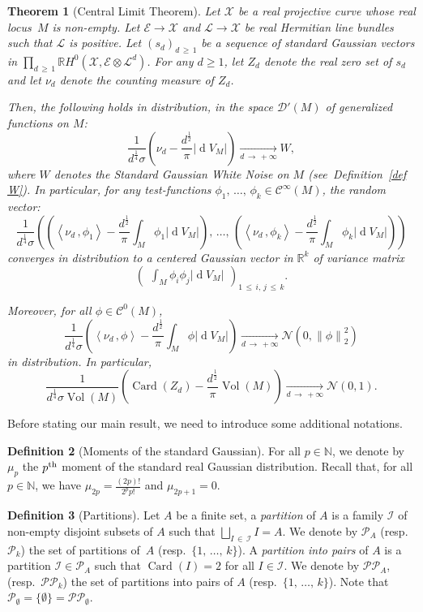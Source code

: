 \documentclass[10pt]{amsart}
\newtheorem{theo}{Theorem}[section]
\theoremstyle{definition}\newtheorem{defi}[theo]{Definition}\newtheorem{rema}[theo]{Remark}\newtheorem{exam}[theo]{Example}\newtheorem{exem}[theo]{Example}\newtheorem{nota}[theo]{Notation}
\DeclareMathOperator{\card}{Card}
\DeclareMathOperator{\dmesure}{d}
\DeclareMathOperator{\Vol}{Vol}
\newcommand{\D}{\mathcal{D}}
\newcommand{\E}{\mathcal{E}}
\newcommand{\I}{\mathcal{I}}
\newcommand{\X}{\mathcal{X}}
\renewcommand{\L}{\mathcal{L}}
\newcommand{\clN}{\mathcal{N}}
\newcommand{\clC}{\mathcal{C}}
\newcommand{\pa}{\mathcal{P}\!}
\newcommand{\pp}{\mathcal{P\!P}\!}
\newcommand{\N}{\mathbb{N}}
\newcommand{\R}{\mathbb{R}}
\newcommand{\norm}[1]{\left\lvert #1 \right\rvert}
\newcommand{\Norm}[1]{\left\lVert #1 \right\rVert}
\newcommand{\prsc}[2]{\left\langle #1\,, #2 \right\rangle}
\newcommand{\rmes}[1]{\norm{\dmesure\! V_{#1}}}
\newcommand{\vol}[1]{\Vol\!\left(#1\right)}
\renewcommand{\H}{H^0(\X,\E \otimes \L^d)}
\renewcommand{\geq}{\geqslant}
\renewcommand{\leq}{\leqslant}
\begin{document}
\begin{theo}[{Central Limit Theorem}]\label{thm central limit theorem}
Let $\X$ be a real projective curve whose real locus~$M$ is non-empty. Let $\E \to \X$ and $\L \to \X$ be real Hermitian line bundles such that $\L$ is positive. Let $(s_d)_{d\,\geq\,1}$ be a sequence of standard Gaussian vectors in $\prod_{d \,\geq\,1}\R \H$. For any $d \geq 1$, let $Z_d$ denote the real zero set of $s_d$ and let $\nu_d$ denote the counting measure of $Z_d$.

Then, the following holds in distribution, in the space $\D'(M)$ of generalized functions on $M$:
\[
\frac{1}{d^\frac{1}{4}\sigma}\left(\nu_d - \frac{d^\frac{1}{2}}{\pi}\rmes{M}\right) \xrightarrow[d\,\to\,+\infty]{} W,
\]
where $W$ denotes the Standard Gaussian White Noise on $M$ (see~Definition~\ref{def W}). In particular, for any test-functions $\phi_1,\,\dots,\,\phi_k \in \clC^\infty(M)$, the random vector:
\[
\frac{1}{d^\frac{1}{4}\sigma}\left(\left(\prsc{\nu_d}{\phi_1} - \frac{d^\frac{1}{2}}{\pi}\int_M \phi_1\rmes{M}\right),\,\dots,\, \left(\prsc{\nu_d}{\phi_k} - \frac{d^\frac{1}{2}}{\pi}\int_M \phi_k\rmes{M}\right)\right)
\]
converges in distribution to a centered Gaussian vector in $\R^k$ of variance matrix 
\[
\begin{pmatrix}
\displaystyle\int_M \phi_i \phi_j \rmes{M}
\end{pmatrix}_{1\,\leq\,i,\,j\,\leq\,k}.
\]

Moreover, for all $\phi \in \clC^0(M)$,
\[
\frac{1}{d^\frac{1}{4}\sigma}\left(\prsc{\nu_d}{\phi} - \frac{d^\frac{1}{2}}{\pi}\int_M \phi\rmes{M}\right) \xrightarrow[d\,\to\,+\infty]{} \clN\left(0,\Norm{\phi}_2^2\right)
\]
in distribution. In particular,
\[
\frac{1}{d^\frac{1}{4}\sigma\vol{M}}\left(\card(Z_d) - \frac{d^\frac{1}{2}}{\pi} \vol{M}\right) \xrightarrow[d\,\to\,+\infty]{} \clN(0,1).
\]
\end{theo}


Before stating our main result, we need to introduce some additional notations.

\begin{defi}[{Moments of the standard Gaussian}]\label{def mu p}
For all $p \in \N$, we denote by $\mu_p$ the $p^{\rm th}$ moment of the standard real Gaussian distribution. Recall that, for all $p \in \N$, we have $\mu_{2p} = \frac{(2p)!}{2^p p!}$ and $\mu_{2p+1}=0$.
\end{defi}

\begin{defi}[{Partitions}]\label{def partitions}
Let $A$ be a finite set, a \emph{partition} of $A$ is a family $\I$ of non-empty disjoint subsets of $A$ such that $\bigsqcup_{I\,\in\,\I} I =A$. We denote by $\pa_A$ (resp.~$\pa_k$) the set of partitions of~$A$ (resp.~$\{1,\,\dots,\,k\}$). A \emph{partition into pairs} of $A$ is a partition $\I \in \pa_A$ such that $\card(I)=2$ for all $I \in \I$. We denote by $\pp_A$, (resp.~$\pp_k$) the set of partitions into pairs of $A$ (resp.~$\{1,\,\dots,\,k\}$). Note that $\pa_\emptyset = \{ \emptyset \} = \pp_\emptyset$.
\end{defi}
\end{document}
